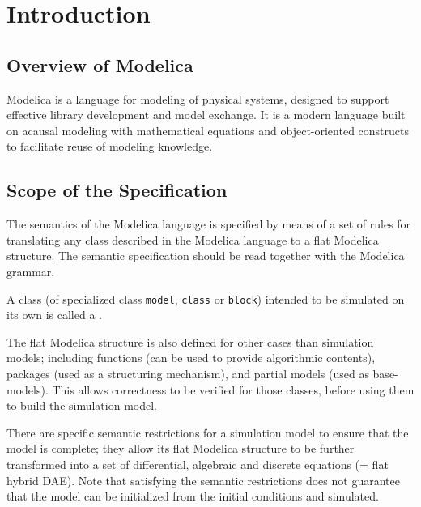 \chapter{Introduction}\label{introduction1}

\section{Overview of Modelica}\label{overview-of-modelica}

Modelica is a language for modeling of physical systems, designed to
support effective library development and model exchange. It is a modern
language built on acausal modeling with mathematical equations and
object-oriented constructs to facilitate reuse of modeling knowledge.

\section{Scope of the Specification}\label{scope-of-the-specification}

The semantics of the Modelica language is specified by means of a set of
rules for translating any class described in the Modelica language to a
flat Modelica structure.
The semantic specification should be read together with the Modelica grammar.

A class (of specialized class \lstinline!model!, \lstinline!class! or \lstinline!block!) intended to be simulated on its own is called a .

The flat Modelica structure is also defined for other cases than
simulation models; including functions (can be used to provide
algorithmic contents), packages (used as a structuring mechanism), and
partial models (used as base-models). This allows correctness to be
verified for those classes, before using them to build the simulation
model.

There are specific semantic restrictions for a simulation model to
ensure that the model is complete; they allow its flat Modelica
structure to be further transformed into a set of differential,
algebraic and discrete equations (= flat hybrid DAE). Note that
satisfying the semantic restrictions does not guarantee that the model
can be initialized from the initial conditions and simulated.

